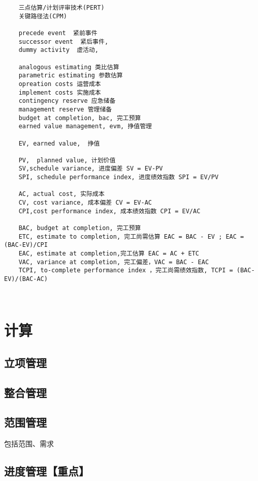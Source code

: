 \documentclass[UTF8]{../computerUniverse}
\begin{document}
\begin{lstlisting}
    三点估算/计划评审技术(PERT)
    关键路径法(CPM) 

    precede event  紧前事件
    successor event  紧后事件,
    dummy activity  虚活动,

    analogous estimating 类比估算
    parametric estimating 参数估算
    opreation costs 运营成本
    implement costs 实施成本
    contingency reserve 应急储备
    management reserve 管理储备
    budget at completion, bac, 完工预算
    earned value management, evm, 挣值管理

    EV, earned value,  挣值
    
    PV,  planned value, 计划价值
    SV,schedule variance, 进度偏差 SV = EV-PV
    SPI, schedule performance index, 进度绩效指数 SPI = EV/PV
    
    AC, actual cost, 实际成本
    CV, cost variance, 成本偏差 CV = EV-AC
    CPI,cost performance index, 成本绩效指数 CPI = EV/AC

    BAC, budget at completion, 完工预算
    ETC, estimate to completion, 完工尚需估算 EAC = BAC - EV ; EAC = (BAC-EV)/CPI
    EAC, estimate at completion,完工估算 EAC = AC + ETC
    VAC, variance at completion, 完工偏差，VAC = BAC - EAC
    TCPI, to-complete performance index ，完工尚需绩效指数, TCPI = (BAC-EV)/(BAC-AC)



\end{lstlisting}



\chapter{计算}


\section{立项管理}

\section{整合管理}

\section{范围管理}
包括范围、需求

\section{进度管理【重点】}
\end{document}
